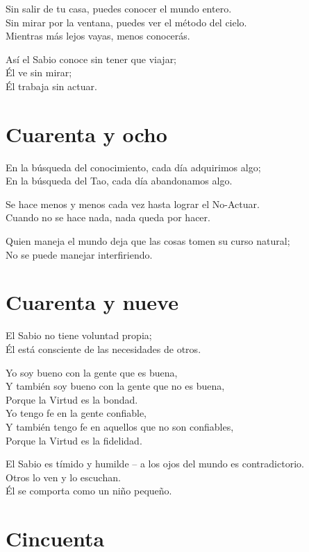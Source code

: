 \documentclass[hidelinks]{memoir}
\begin{document}
	Sin salir de tu casa, puedes conocer el mundo entero.\\
	Sin mirar por la ventana, puedes ver el método del cielo.\\
	Mientras más lejos vayas, menos conocerás.
	
	Así el Sabio conoce sin tener que viajar;\\
	Él ve sin mirar;\\
	Él trabaja sin actuar.
	
	\chapter*{Cuarenta y ocho}
	
	En la búsqueda del conocimiento, cada día adquirimos algo;\\
	En la búsqueda del Tao, cada día abandonamos algo.
	
	Se hace menos y menos cada vez hasta lograr el No-Actuar.\\
	Cuando no se hace nada, nada queda por hacer.
	
	Quien maneja el mundo deja que las cosas tomen su curso natural;\\
	No se puede manejar interfiriendo.
	
	\chapter*{Cuarenta y nueve}
	
	El Sabio no tiene voluntad propia;\\
	Él está consciente de las necesidades de otros.
	
	Yo soy bueno con la gente que es buena,\\
	Y también soy bueno con la gente que no es buena,\\
	Porque la Virtud es la bondad.\\
	Yo tengo fe en la gente confiable,\\
	Y también tengo fe en aquellos que no son confiables,\\
	Porque la Virtud es la fidelidad.
	
	El Sabio es tímido y humilde -- a los ojos del mundo es
	contradictorio.\\
	Otros lo ven y lo escuchan.\\
	Él se comporta como un niño pequeño.
	
	\chapter*{Cincuenta}
	
\end{document}
